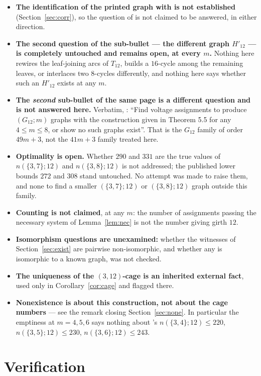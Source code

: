 \documentclass[11pt]{amsart}
\theoremstyle{remark}
\begin{document}
\begin{itemize}
\item \textbf{The identification of the printed graph with \cite[Figure~16]{AAB} is not
established} (Section~\ref{sec:corr}), so the question of \cite{AAB} is not claimed to be
answered, in either direction.
\item \textbf{The second question of the sub-bullet --- the different graph $H'_{12}$ --- is
completely untouched and remains open, at every $m$.} Nothing here rewires the leaf-joining arcs
of $T_{12}$, builds a $16$-cycle among the remaining leaves, or interlaces two $8$-cycles
differently, and nothing here says whether such an $H'_{12}$ exists at any $m$.
\item \textbf{The \emph{second} sub-bullet of the same page is a different question and is not
answered here.} Verbatim, \cite[p.~29]{AAB}: ``Find voltage assignments to produce
$(G_{12};m)$ graphs with the construction given in Theorem 5.5 for any $4\le m\le 8$, or show
no such graphs exist''. That is the $G_{12}$ family of order $49m+3$, not the $41m+3$ family
treated here.
\item \textbf{Optimality is open.} Whether $290$ and $331$ are the true values of
$n(\{3,7\};12)$ and $n(\{3,8\};12)$ is not addressed; the published lower bounds $272$ and
$308$ stand untouched. No attempt was made to raise them, and none to find a smaller
$(\{3,7\};12)$ or $(\{3,8\};12)$ graph outside this family.
\item \textbf{Counting is not claimed}, at any $m$: the number of assignments passing the
necessary system of Lemma~\ref{lem:nec} is not the number giving girth $12$.
\item \textbf{Isomorphism questions are unexamined:} whether the witnesses of
Section~\ref{sec:exist} are pairwise non-isomorphic, and whether any is isomorphic to a known
graph, was not checked.
\item \textbf{The uniqueness of the $(3,12)$-cage is an inherited external fact}, used only in
Corollary~\ref{cor:cage} and flagged there.
\item \textbf{Nonexistence is about this construction, not about the cage numbers} --- see the
remark closing Section~\ref{sec:none}. In particular the emptiness at $m=4,5,6$ says nothing
about \cite{GJV}'s $n(\{3,4\};12)\le 220$, $n(\{3,5\};12)\le 230$, $n(\{3,6\};12)\le 243$.
\end{itemize}

\section{Verification}\label{sec:verify}
\end{document}
